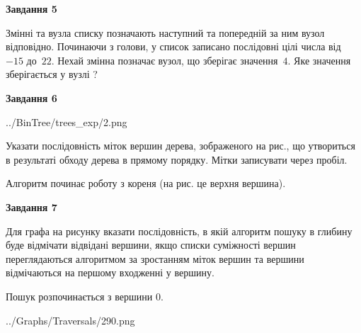 \documentclass[12pt, ukrainian]{article}
\begin{document}
{\begin {large}
{\begin {center}\textbf{Завдання 5}\end {center}}\par
Змінні  та  вузла списку позначають наступний та попередній за ним вузол відповідно. Починаючи з голови, у список записано послідовні цілі числа від~$-15$ до~$22$. Нехай змінна  позначає вузол, що зберігає значення~$4$.
Яке значення зберігається у вузлі  ?\par
\newpage

{\begin {center}\textbf{Завдання 6}\end {center}}\par

\begin{center}
	{../BinTree/trees_exp/2.png}
\end{center}
Указати послідовність міток вершин дерева, зображеного на рис., що утвориться в результаті обходу дерева в прямому порядку. Мітки записувати через пробіл.\par Алгоритм починає роботу з кореня (на рис. це верхня вершина).\par
\newpage

{\begin {center}\textbf{Завдання 7}\end {center}}\par
Для графа на рисунку вказати послідовність, в якій алгоритм пошуку в глибину буде відмічати відвідані вершини, якщо списки суміжності вершин переглядаються алгоритмом за зростанням міток вершин та вершини відмічаються на першому вход\-женні у вершину.\par
Пошук розпочинається з вершини 0.\par

\begin{center}
	{../Graphs/Traversals/290.png}
\end{center}\par
\newpage


\end{large}}
\end{document}
